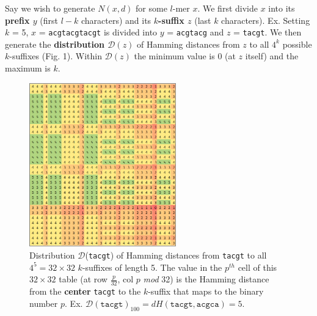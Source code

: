 \documentclass{acm_proc_article-sp}
\begin{document}
\begin{enumerate}
			Say we wish to generate $N(x,d)$ for some $l$-mer $x$. We first divide $x$ into its {\boldmath\bf prefix $y$} (first $l-k$ characters) and its {\boldmath\bf $k$-suffix $z$} (last $k$ characters).\newline\newline	
				{\small 
					Ex. Setting $k$ = 5, $x$ = \texttt{acgtacgtacgt}\newline
					\hspace*{18pt}is divided into $y$ = \texttt{acgtacg} and $z$ = \texttt{tacgt}.}\newline\newline
			We then generate the {\boldmath\bf distribution $\mathcal{D}(z)$} of Hamming distances from $z$ to all $4^{k}$ possible $k$-suffixes (Fig. 1). Within $\mathcal{D}(z)$ the minimum value is 0 (at $z$ itself) and the maximum is $k$.%
			\begin{figure}[h]
				\centering
				\label{fig:distribution}
				\includegraphics[width=2.5in]{img/D(tacgt)}
				\caption{\small
					Distribution $\mathcal{D}$(\texttt{tacgt}) of Hamming distances from \texttt{tacgt} 
					to all $4^{5} = 32\times32$ $k$-suffixes of length 5.
					The value in the $p^{th}$ cell of this $32\times32$ table (at row $\frac{p}{32}$, col $p$ \emph{mod} 32) is the Hamming distance from the \textbf{center} \texttt{tacgt} to the $k$-suffix that maps to the binary number $p$.\newline
					Ex. $\mathcal{D}(\texttt{tacgt})_{100} = dH(\texttt{tacgt}, \texttt{acgca}) = 5$.\newline
				}
				\end{figure}\newline

\end{enumerate}
\end{document}
